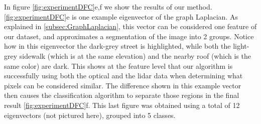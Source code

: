 \documentclass{article}
\begin{document}
In figure \ref{fig:experimentDFC}e,f we show the results of our
method. \ref{fig:experimentDFC}e is one example eigenvector of the graph
Laplacian. As explained in \ref{subsec:GraphLaplacian}, this vector can be
considered one feature of our dataset, and approximates a segmentation of the
image into 2 groups. Notice how in this eigenvector the dark-grey street is
highlighted, while both the light-grey sidewalk (which is at the same elevation)
and the nearby roof (which is the same color) are dark. This shows at the
feature level that our algorithm is successfully using both the optical and the
lidar data when determining what pixels can be considered similar. The
difference shown in this example vector then causes the classification algorithm
to separate those regions in the final result \ref{fig:experimentDFC}f.  This
last figure was obtained using a total of 12 eigenvectors (not pictured here),
grouped into 5 classes.
\end{document}
